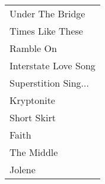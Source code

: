 \twocolumn
\begin{table}[h]
\centering\begin{tabularx}{0.5\textwidth}{p{}}
\multicolumn{1}{l}{\hspace*{4pt}\rule{0pt}{\baselineskip+4pt}\raggedright {\fontsize{24pt}{28.8pt}\selectfont Under The Bridge}\rule[-4pt]{0pt}{4pt}\hspace*{4pt}} \tabularnewline[-0.5pt]
\multicolumn{1}{l}{\hspace*{4pt}\rule{0pt}{\baselineskip+4pt}\raggedright {\fontsize{24pt}{28.8pt}\selectfont Times Like These}\rule[-4pt]{0pt}{4pt}\hspace*{4pt}} \tabularnewline[-0.5pt]
\multicolumn{1}{l}{\hspace*{4pt}\rule{0pt}{\baselineskip+4pt}\raggedright {\fontsize{24pt}{28.8pt}\selectfont Ramble On}\rule[-4pt]{0pt}{4pt}\hspace*{4pt}} \tabularnewline[-0.5pt]
\multicolumn{1}{l}{\hspace*{4pt}\rule{0pt}{\baselineskip+4pt}\raggedright {\fontsize{24pt}{28.8pt}\selectfont Interstate Love Song}\rule[-4pt]{0pt}{4pt}\hspace*{4pt}} \tabularnewline[-0.5pt]
\multicolumn{1}{l}{\hspace*{4pt}\rule{0pt}{\baselineskip+4pt}\raggedright {\fontsize{24pt}{28.8pt}\selectfont Superstition Sing...}\rule[-4pt]{0pt}{4pt}\hspace*{4pt}} \tabularnewline[-0.5pt]
\multicolumn{1}{l}{\hspace*{4pt}\rule{0pt}{\baselineskip+4pt}\raggedright {\fontsize{24pt}{28.8pt}\selectfont Kryptonite}\rule[-4pt]{0pt}{4pt}\hspace*{4pt}} \tabularnewline[-0.5pt]
\multicolumn{1}{l}{\hspace*{4pt}\rule{0pt}{\baselineskip+4pt}\raggedright {\fontsize{24pt}{28.8pt}\selectfont Short Skirt}\rule[-4pt]{0pt}{4pt}\hspace*{4pt}} \tabularnewline[-0.5pt]
\multicolumn{1}{l}{\hspace*{4pt}\rule{0pt}{\baselineskip+4pt}\raggedright {\fontsize{24pt}{28.8pt}\selectfont Faith}\rule[-4pt]{0pt}{4pt}\hspace*{4pt}} \tabularnewline[-0.5pt]
\multicolumn{1}{l}{\hspace*{4pt}\rule{0pt}{\baselineskip+4pt}\raggedright {\fontsize{24pt}{28.8pt}\selectfont The Middle}\rule[-4pt]{0pt}{4pt}\hspace*{4pt}} \tabularnewline[-0.5pt]
\multicolumn{1}{l}{\hspace*{4pt}\rule{0pt}{\baselineskip+4pt}\raggedright {\fontsize{24pt}{28.8pt}\selectfont Jolene}\rule[-4pt]{0pt}{4pt}\hspace*{4pt}} \tabularnewline[-0.5pt]

\end{tabularx}
\end{table}
